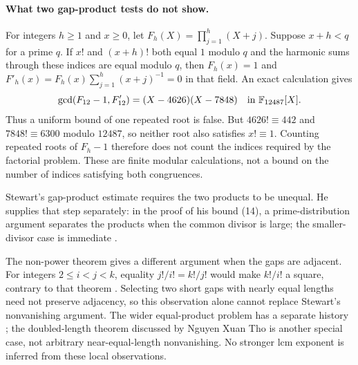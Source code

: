 \documentclass[11pt]{article}
\begin{document}
\paragraph{What two gap-product tests do not show.}
For integers $h\ge1$ and $x\ge0$, let
$F_h(X)=\prod_{j=1}^h(X+j)$. Suppose $x+h<q$ for a prime $q$.
If $x!$ and $(x+h)!$ both equal $1$ modulo $q$ and the harmonic sums
through these indices are equal modulo $q$,
then $F_h(x)=1$ and
$F'_h(x)=F_h(x)\sum_{j=1}^h(x+j)^{-1}=0$ in that field.  An exact calculation gives
\[
 \gcd(F_{12}-1,F'_{12})
 =(X-4626)(X-7848)\quad\hbox{in }\mathbb F_{12487}[X].
\]
Thus a uniform bound of one repeated root is false. But $4626!\equiv442$ and $7848!\equiv6300$
modulo $12487$, so neither root also satisfies $x!\equiv1$. Counting
repeated roots of $F_h-1$ therefore does not count the indices required
by the factorial problem. These are finite modular calculations, not a
bound on the number of indices satisfying both congruences.

Stewart's gap-product estimate
\cite[Lemma~2, (21)--(24)]{stewart2004} requires the two products to be
unequal. He supplies that step separately: in the proof of his bound
(14), a prime-distribution argument separates the products when the common
divisor is large; the smaller-divisor case is immediate
\cite[p.~467, proof of Lemma~2]{stewart2004}.

The non-power theorem gives a different argument when the gaps are
adjacent. For integers $2\le i<j<k$, equality $j!/i!=k!/j!$ would make $k!/i!$ a
square, contrary to that theorem \cite[Theorem~1]{erdos-selfridge1975}.
Selecting two short gaps with nearly equal lengths need not preserve
adjacency, so this observation alone cannot replace Stewart's nonvanishing
argument. The wider equal-product problem has a separate history
\cite{macleod-barrodale1970}; the doubled-length theorem discussed by
Nguyen Xuan Tho \cite[Theorem~1]{nguyen-tho2026} is another special case,
not arbitrary near-equal-length nonvanishing. No stronger lcm exponent is
inferred from these local observations.
\end{document}
